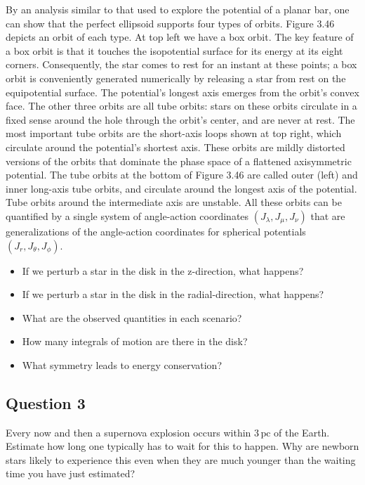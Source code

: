 \documentclass[a4paper,10pt]{article}
\begin{document}
{\noindent}By an analysis similar to that used to explore the potential of a planar bar, one can show that the perfect ellipsoid supports four types of orbits. Figure 3.46 depicts an orbit of each type. At top left we have a box orbit. The key feature of a box orbit is that it touches the isopotential surface for its energy at its eight corners. Consequently, the star comes to rest for an instant at these points; a box orbit is conveniently generated numerically by releasing a star from rest on the equipotential surface. The potential's longest axis emerges from the orbit’s convex face. The other three orbits are all tube orbits: stars on these orbits circulate in a fixed sense around the hole through the orbit's center, and are never at rest. The most important tube orbits are the short-axis loops shown at top right, which circulate around the potential's shortest axis. These orbits are mildly distorted versions of the orbits that dominate the phase space of a flattened axisymmetric potential. The tube orbits at the bottom of Figure 3.46 are called outer (left) and inner long-axis tube orbits, and circulate around the longest axis of the potential. Tube orbits around the intermediate axis are unstable. All these orbits can be quantified by a single system of angle-action coordinates $(J_\lambda,J_\mu,J_\nu)$ that are generalizations of the angle-action coordinates for spherical potentials $(J_r,J_\theta,J_\phi)$.

\begin{itemize}
    \item If we perturb a star in the disk in the z-direction, what happens?
    \item If we perturb a star in the disk in the radial-direction, what happens?
    \item What are the observed quantities in each scenario?
    \item How many integrals of motion are there in the disk?
    \item What symmetry leads to energy conservation?
\end{itemize}



\newpage
\subsection{Question 3}

Every now and then a supernova explosion occurs within $3\,\mathrm{pc}$ of the Earth. Estimate how long one typically has to wait for this to happen. Why are newborn stars likely to experience this even when they are much younger than the waiting time you have just estimated?
\end{document}
